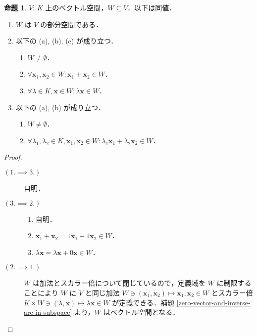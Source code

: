 \documentclass{jlreq}
\theoremstyle{definition}
\newtheorem{prop}[thm]{命題}
\begin{document}
      \begin{prop}
        $V$: $K$ 上のベクトル空間，$W \subseteq V$．以下は同値．
        \begin{enumerate}
          \item $W$ は $V$ の部分空間である．
          \item 以下の (a), (b), (c) が成り立つ．
            \begin{enumerate}
              \item $W \neq \emptyset$．
              \item $\forall \bm{x}_1,\bm{x}_2 \in W: \bm{x}_1+\bm{x}_2 \in W$．
              \item $\forall \lambda \in K, \bm{x} \in W: \lambda\bm{x} \in W$．
            \end{enumerate}
          \item 以下の (a), (b) が成り立つ．
            \begin{enumerate}
              \item $W \neq \emptyset$．
              \item $\forall \lambda_1,\lambda_2 \in K, \bm{x}_1,\bm{x}_2 \in W: \lambda_1\bm{x}_1+\lambda_2\bm{x}_2 \in W$．
            \end{enumerate}
        \end{enumerate}
      \end{prop}
      \begin{proof}
        \mbox{}
        \begin{description}
          \item [$(1. \implies 3.) \, $] 自明．
          \item [$(3. \implies 2.) \, $] \mbox{}\begin{enumerate}[label=\text{(\alph*) }] 
              \item 自明．
              \item $\bm{x}_1+\bm{x}_2=1\bm{x}_1+1\bm{x}_2 \in W$．
              \item $\lambda \bm{x} = \lambda\bm{x}+0\bm{x} \in W$．
          \end{enumerate}
          \item [$(2. \implies 1.) \, $]
            \mbox{}
            
            $W$ は加法とスカラー倍について閉じているので，定義域を $W$ に制限することにより $W$ に $V$ と同じ加法 $W \ni (\bm{x}_1,\bm{x}_2) \mapsto \bm{x}_1,\bm{x}_2 \in W$ とスカラー倍 $K \times W \ni (\lambda,\bm{x}) \mapsto \lambda\bm{x} \in W$ が定義できる．補題 \ref{zero-vector-and-inverse-are-in-subspace} より，$W$ はベクトル空間となる．
        \end{description}
      \end{proof}
\end{document}
